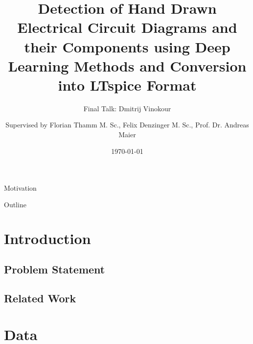 \documentclass[aspectratio=43,t]{beamer}
\title[CID]{Detection of Hand Drawn Electrical Circuit Diagrams and their Components using Deep Learning Methods and Conversion into LTspice Format}
\subtitle{Final Talk: Dmitrij Vinokour}
\author[D.\ Vinokour]{Supervised by Florian Thamm M. Sc., Felix Denzinger M. Sc., Prof. Dr. Andreas Maier}
\institute[Pattern Recognition Lab]{Pattern Recognition Lab, Friedrich-Alexander University Erlangen-Nürnberg}
\date{\today}
\begin{document}
  \maketitle


{ %
\begin{frame}[noframenumbering]{Motivation}



\end{frame}
}

{ %
\begin{frame}[noframenumbering]{Outline}
  \tableofcontents
\end{frame}
}

\section{Introduction}



\subsection{Problem Statement}

\subsection{Related Work}

\section{Data}
\end{document}
